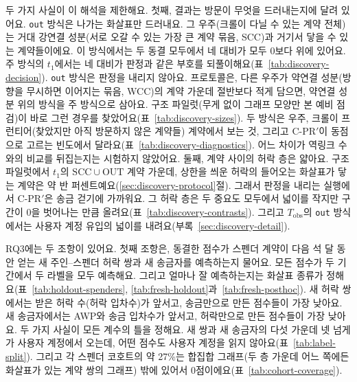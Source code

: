 두 가지 사실이 이 해석을 제한해요. 첫째, 결과는 방문이 무엇을 드러내는지에 달려 있어요. \texttt{out} 방식은 나가는 화살표만 드러내요. 그 우주(크롤이 다닐 수 있는 계약 전체)는 거대 강연결 성분(서로 오갈 수 있는 가장 큰 계약 묶음, SCC)과 거기서 닿을 수 있는 계약들이에요. 이 방식에서는 두 동결 모두에서 네 대비가 모두 0보다 위에 있어요. 주 방식의 $t_1$에서는 네 대비가 판정과 같은 부호를 되풀이해요(표~\ref{tab:discovery-decision}). \texttt{out} 방식은 판정을 내리지 않아요. 프로토콜은, 다른 우주가 약연결 성분(방향을 무시하면 이어지는 묶음, WCC)의 계약 가운데 절반보다 적게 담으면, 약연결 성분 위의 방식을 주 방식으로 삼아요. 구조 파일럿(무게 없이 그래프 모양만 본 예비 점검)이 바로 그런 경우를 찾았어요(표~\ref{tab:discovery-sizes}). 두 방식은 우주, 크롤이 프런티어(찾았지만 아직 방문하지 않은 계약들) 계약에서 보는 것, 그리고 \mbox{C-PR}$'$이 동점으로 고르는 빈도에서 달라요(표~\ref{tab:discovery-diagnostics}). 어느 차이가 역링크 수와의 비교를 뒤집는지는 시험하지 않았어요. 둘째, 계약 사이의 허락 층은 얇아요. 구조 파일럿에서 $t_1$의 $\mathrm{SCC}\cup\mathrm{OUT}$ 계약 가운데, 상한을 씌운 허락의 들어오는 화살표가 닿는 계약은 약 반 퍼센트예요(\ref{sec:discovery-protocol}절). 그래서 판정을 내리는 실행에서 \mbox{C-PR}$'$은 송금 걷기에 가까워요. 그 허락 층은 두 중요도 모두에서 넓이를 작지만 구간이 0을 벗어나는 만큼 올려요(표~\ref{tab:discovery-contrasts}). 그리고 $T_{\mathrm{obs}}$의 \texttt{out} 방식에서는 사용자 계정 유입의 넓이를 내려요(부록~\ref{sec:discovery-detail}).


RQ3에는 두 조항이 있어요. 첫째 조항은, 동결한 점수가 스펜더 계약이 다음 석 달 동안 얻는 새 주인--스펜더 허락 쌍과 새 송금자를 예측하는지 물어요. 모든 점수가 두 기간에서 두 라벨을 모두 예측해요. 그리고 얼마나 잘 예측하는지는 화살표 종류가 정해요(표~\ref{tab:holdout-spenders}, \ref{tab:fresh-holdout}과~\ref{tab:fresh-posthoc}). 새 허락 쌍에서는 받은 허락 수(허락 입차수)가 앞서고, 송금만으로 만든 점수들이 가장 낮아요. 새 송금자에서는 AWP와 송금 입차수가 앞서고, 허락만으로 만든 점수들이 가장 낮아요. 두 가지 사실이 모든 계수의 틀을 정해요. 새 쌍과 새 송금자의 다섯 가운데 넷 넘게가 사용자 계정에서 오는데, 어떤 점수도 사용자 계정을 읽지 않아요(표~\ref{tab:label-split}). 그리고 각 스펜더 코호트의 약 27\%는 합집합 그래프(두 층 가운데 어느 쪽에든 화살표가 있는 계약 쌍의 그래프) 밖에 있어서 0점이에요(표~\ref{tab:cohort-coverage}).

